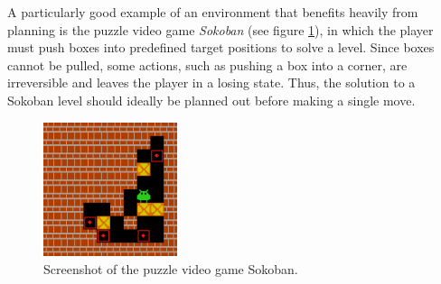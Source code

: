 A particularly good example of an environment that benefits heavily from planning is the puzzle video game \textit{Sokoban} (see figure \ref{fig:sokoban}), in which the player must push boxes into predefined target positions to solve a level. Since boxes cannot be pulled, some actions, such as pushing a box into a corner, are irreversible and leaves the player in a losing state. Thus, the solution to a Sokoban level should ideally be planned out before making a single move.
\begin{figure}[ht]
    \centering
    \includegraphics[width=0.35\textwidth]{assets/sokoban.png}
    \caption{Screenshot of the puzzle video game Sokoban. \cite{sokoban}}
    \label{fig:sokoban}
\end{figure}